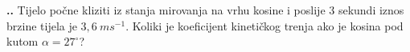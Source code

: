 

\noindent 
\textbf{
\thecjelina.\thezadatak.}
Tijelo počne kliziti iz stanja mirovanja na vrhu kosine i poslije $3$ sekundi iznos brzine tijela je $3,6\ ms^{-1}$. Koliki je koeficijent kinetičkog trenja ako je kosina pod kutom $\alpha=27^\circ$?


